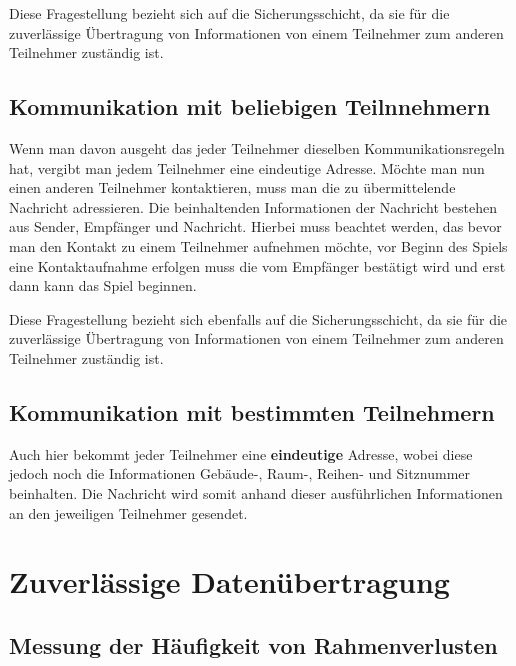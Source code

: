 \documentclass{scrartcl}
\begin{document}
   Diese Fragestellung bezieht sich auf die Sicherungsschicht, da sie für die zuverlässige Übertragung von Informationen von einem Teilnehmer zum anderen Teilnehmer zuständig ist.
   
    \subsection[Aufgabe 7 Kommunikation mit beliebigen Teilnnehmern]{Kommunikation mit beliebigen Teilnnehmern}
    
    Wenn man davon ausgeht das jeder Teilnehmer dieselben Kommunikationsregeln hat, vergibt man jedem Teilnehmer eine eindeutige Adresse. Möchte man nun einen anderen Teilnehmer kontaktieren, muss man die zu übermittelende Nachricht adressieren. Die beinhaltenden Informationen der Nachricht bestehen aus Sender, Empfänger und Nachricht. Hierbei muss beachtet werden, das bevor man den Kontakt zu einem Teilnehmer aufnehmen möchte, vor Beginn des Spiels eine Kontaktaufnahme erfolgen muss die vom Empfänger bestätigt wird und erst dann kann das Spiel beginnen.
    
    Diese Fragestellung bezieht sich ebenfalls auf die Sicherungsschicht, da sie für die zuverlässige Übertragung von Informationen von einem Teilnehmer zum anderen Teilnehmer zuständig ist.
    
    \subsection[Aufgabe 8 Kommunikation mit bestimmten Teilnehmern]{Kommunikation mit bestimmten Teilnehmern}
    
    Auch hier bekommt jeder Teilnehmer eine \textbf{eindeutige} Adresse, wobei diese jedoch noch die Informationen Gebäude-, Raum-, Reihen- und Sitznummer beinhalten. Die Nachricht wird somit anhand dieser ausführlichen Informationen an den jeweiligen Teilnehmer gesendet.
    
    
  
  
  
  \newpage
\section[Versuch 2 Zuverlässige Datenübertragung]{Zuverlässige Datenübertragung}
  \subsection[Aufgabe 2 Messung der Häufigkeit von Rahmenverlusten]{Messung der Häufigkeit von Rahmenverlusten}
  
\end{document}
